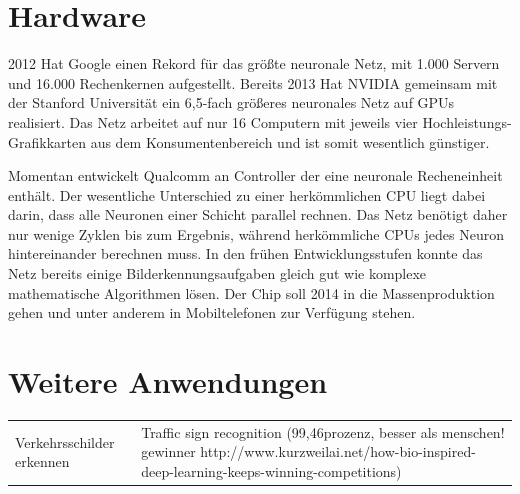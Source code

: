 \section{Hardware}

2012 Hat Google einen Rekord für das größte neuronale Netz, mit 1.000 Servern und 16.000 Rechenkernen aufgestellt. Bereits 2013 Hat NVIDIA gemeinsam mit der Stanford Universität ein 6,5-fach größeres neuronales Netz auf GPUs realisiert. Das Netz arbeitet auf nur 16 Computern mit jeweils vier Hochleistungs-Grafikkarten aus dem Konsumentenbereich und ist somit wesentlich günstiger.

Momentan entwickelt Qualcomm an Controller der eine neuronale Recheneinheit enthält. Der wesentliche Unterschied zu einer herkömmlichen CPU liegt dabei darin, dass alle Neuronen einer Schicht parallel rechnen. Das Netz benötigt daher nur wenige Zyklen bis zum Ergebnis, während herkömmliche CPUs jedes Neuron hintereinander berechnen muss. In den frühen Entwicklungsstufen konnte das Netz bereits einige Bilderkennungsaufgaben gleich gut wie komplexe mathematische Algorithmen lösen. Der Chip soll 2014 in die Massenproduktion gehen und unter anderem in Mobiltelefonen zur Verfügung stehen.

\section{Weitere Anwendungen}

\begin{tabular}{l l}
Verkehrsschilder erkennen & Traffic sign recognition (99,46prozenz, besser als menschen! gewinner http://www.kurzweilai.net/how-bio-inspired-deep-learning-keeps-winning-competitions)
\end{tabular}
